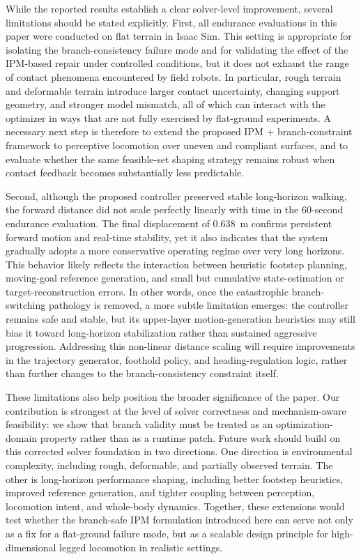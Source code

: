 While the reported results establish a clear solver-level improvement, several limitations should be stated explicitly. First, all endurance evaluations in this paper were conducted on flat terrain in Isaac Sim. This setting is appropriate for isolating the branch-consistency failure mode and for validating the effect of the IPM-based repair under controlled conditions, but it does not exhaust the range of contact phenomena encountered by field robots. In particular, rough terrain and deformable terrain introduce larger contact uncertainty, changing support geometry, and stronger model mismatch, all of which can interact with the optimizer in ways that are not fully exercised by flat-ground experiments. A necessary next step is therefore to extend the proposed IPM + branch-constraint framework to perceptive locomotion over uneven and compliant surfaces, and to evaluate whether the same feasible-set shaping strategy remains robust when contact feedback becomes substantially less predictable.

Second, although the proposed controller preserved stable long-horizon walking, the forward distance did not scale perfectly linearly with time in the 60-second endurance evaluation. The final displacement of 0.638~m confirms persistent forward motion and real-time stability, yet it also indicates that the system gradually adopts a more conservative operating regime over very long horizons. This behavior likely reflects the interaction between heuristic footstep planning, moving-goal reference generation, and small but cumulative state-estimation or target-reconstruction errors. In other words, once the catastrophic branch-switching pathology is removed, a more subtle limitation emerges: the controller remains safe and stable, but its upper-layer motion-generation heuristics may still bias it toward long-horizon stabilization rather than sustained aggressive progression. Addressing this non-linear distance scaling will require improvements in the trajectory generator, foothold policy, and heading-regulation logic, rather than further changes to the branch-consistency constraint itself.

These limitations also help position the broader significance of the paper. Our contribution is strongest at the level of solver correctness and mechanism-aware feasibility: we show that branch validity must be treated as an optimization-domain property rather than as a runtime patch. Future work should build on this corrected solver foundation in two directions. One direction is environmental complexity, including rough, deformable, and partially observed terrain. The other is long-horizon performance shaping, including better footstep heuristics, improved reference generation, and tighter coupling between perception, locomotion intent, and whole-body dynamics. Together, these extensions would test whether the branch-safe IPM formulation introduced here can serve not only as a fix for a flat-ground failure mode, but as a scalable design principle for high-dimensional legged locomotion in realistic settings.
